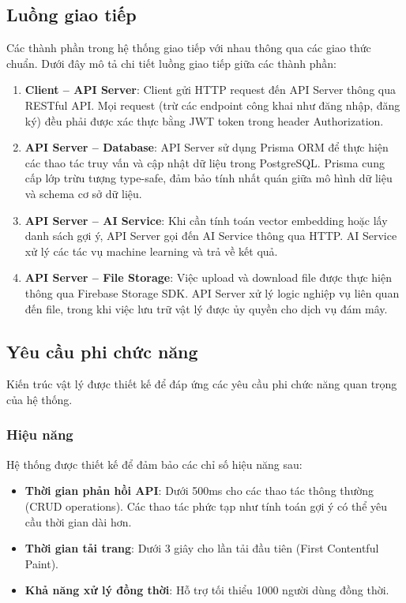 \subsection{Luồng giao tiếp}
\label{subsec:communication-flow}

Các thành phần trong hệ thống giao tiếp với nhau thông qua các giao thức chuẩn. Dưới đây mô tả chi tiết luồng giao tiếp giữa các thành phần:

\begin{enumerate}
    \item \textbf{Client -- API Server}: Client gửi HTTP request đến API Server thông qua RESTful API. Mọi request (trừ các endpoint công khai như đăng nhập, đăng ký) đều phải được xác thực bằng JWT token trong header Authorization.

    \item \textbf{API Server -- Database}: API Server sử dụng Prisma ORM để thực hiện các thao tác truy vấn và cập nhật dữ liệu trong PostgreSQL. Prisma cung cấp lớp trừu tượng type-safe, đảm bảo tính nhất quán giữa mô hình dữ liệu và schema cơ sở dữ liệu.

    \item \textbf{API Server -- AI Service}: Khi cần tính toán vector embedding hoặc lấy danh sách gợi ý, API Server gọi đến AI Service thông qua HTTP. AI Service xử lý các tác vụ machine learning và trả về kết quả.

    \item \textbf{API Server -- File Storage}: Việc upload và download file được thực hiện thông qua Firebase Storage SDK. API Server xử lý logic nghiệp vụ liên quan đến file, trong khi việc lưu trữ vật lý được ủy quyền cho dịch vụ đám mây.
\end{enumerate}

\subsection{Yêu cầu phi chức năng}
\label{subsec:nfr-physical}

Kiến trúc vật lý được thiết kế để đáp ứng các yêu cầu phi chức năng quan trọng của hệ thống.

\subsubsection{Hiệu năng}

Hệ thống được thiết kế để đảm bảo các chỉ số hiệu năng sau:

\begin{itemize}
    \item \textbf{Thời gian phản hồi API}: Dưới 500ms cho các thao tác thông thường (CRUD operations). Các thao tác phức tạp như tính toán gợi ý có thể yêu cầu thời gian dài hơn.
    \item \textbf{Thời gian tải trang}: Dưới 3 giây cho lần tải đầu tiên (First Contentful Paint).
    \item \textbf{Khả năng xử lý đồng thời}: Hỗ trợ tối thiểu 1000 người dùng đồng thời.
\end{itemize}

